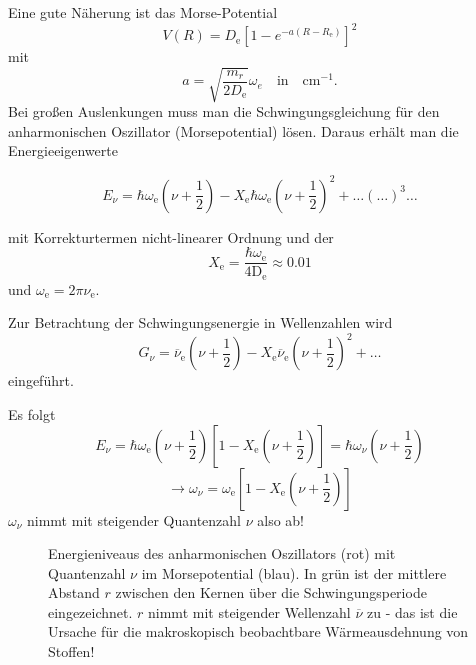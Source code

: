 	Eine gute Näherung ist das Morse-Potential
	\begin{equation}
		\label{4.33}
		V(R) = D_{\mathrm{e}} \left[ 1 - e^{-a (R-R_{\mathrm{e}})} \right] ^2 
	\end{equation}
	mit
	$$
	a = \sqrt{ \frac{m_{r}}{2 D_{\mathrm{e}}}} \omega_{e} \quad \text{in}\quad \unit{\centi \meter ^{-1}}.
	$$ 
	Bei großen Auslenkungen muss man die Schwingungsgleichung für den anharmonischen Oszillator (Morsepotential) lösen.
	Daraus erhält man die Energieeigenwerte 
	\begin{important}
		\begin{equation}
		\label{4.34}
		E_{ \nu} = \hbar \omega_{\mathrm{e}} \left( \nu + \frac{1}{2} \right) - X_{\mathrm{e}} \hbar \omega_{\mathrm{e}} \left( \nu + \frac{1}{2} \right)^2 + \ldots(\ldots)^3 \ldots
	\end{equation}
	\end{important}
	mit Korrekturtermen nicht-linearer Ordnung und der  $$X_\mathrm e=\frac{\hbar  \omega_{\mathrm{e}}}{ 4 \mathrm{D}_{\mathrm{e}}} \approx \num{0,01}$$ und $\omega_\mathrm e = 2\pi\nu_\mathrm e$.
	\begin{definition}{}
		Zur Betrachtung der Schwingungsenergie in Wellenzahlen wird
		$$
		G_{ \nu} = \overline{ \nu}_{\mathrm{e}} \left( \nu + \frac{1}{2} \right) - X_{\mathrm{e}} \overline{ \nu}_{\mathrm{e}} \left( \nu + \frac{1}{2} \right) ^2  + \ldots
		$$ 
		eingeführt.
	\end{definition}
	
	Es folgt
	$$
	E_{ \nu} = \hbar  \omega_{\mathrm{e}} \left( \nu + \frac{1}{2} \right) \left[ 1 - X_{\mathrm{e}} \left( \nu + \frac{1}{2} \right)  \right] = \hbar  \omega_{ \nu} \left( \nu + \frac{1}{2} \right) 
	$$
	$$
	\to \omega_{ \nu} = \omega_{ \mathrm{e}} \left[ 1- X_{\mathrm{e}} \left( \nu + \frac{1}{2} \right)  \right] 
	$$ 
	$ \omega_{ \nu}$ nimmt mit steigender Quantenzahl $ \nu$ also ab!

	\begin{figure}[H]
		\centering
		\caption{Energieniveaus des anharmonischen Oszillators (rot) mit Quantenzahl $\nu$ im Morsepotential (blau). 
			In grün ist der mittlere Abstand $r$ zwischen den Kernen über die Schwingungsperiode eingezeichnet.
			$r$ nimmt mit steigender Wellenzahl $\overline\nu$ zu - das ist die Ursache für die makroskopisch beobachtbare Wärmeausdehnung von Stoffen!}
		\label{fig:vl09_abbildung_5}
	\end{figure}

